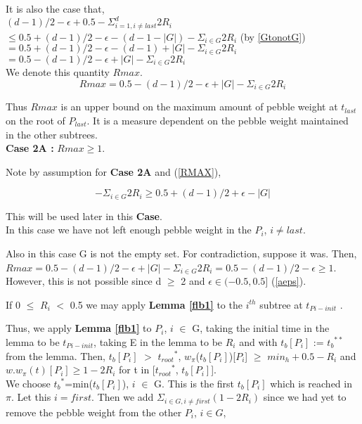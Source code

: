 \documentclass[12pt]{article}
\newcommand{\troots}{{t_{root}}^*}
\newcommand{\tbss}{{t_b}^{**}}
\newcommand{\tbs}{{t_b}^{*}}
\newcommand{\tbith}{t_b[{P_i}]}
\begin{document}
It is also the case that,\\
$(d-1)/2 -\epsilon +0.5- \Sigma_{i=1, i \ne last}^d 2R_i$ $\leq 0.5 + (d-1)/2 - \epsilon - (d-1-|G|) - \Sigma_{ i\in G} 2R_i$ (by \ref{GtonotG})\\
$= 0.5 + (d-1)/2 - \epsilon - (d-1) + |G| - \Sigma_{ i\in G} 2R_i$ \\
$= 0.5 - (d-1)/2 - \epsilon + |G| - \Sigma_{ i\in G} 2R_i$\\
We denote this quantity $Rmax$.
\begin{equation} Rmax = 0.5 - (d-1)/2 - \epsilon + |G| - \Sigma_{ i\in G} 2R_i \label{RMAX}\end{equation}

Thus $Rmax$ is an upper bound on the maximum amount of pebble weight at $t_{last}$ on the root of $P_{last}$. It is a measure dependent on the pebble weight maintained in the other subtrees.\\



\noindent
{\bf Case 2A :} $Rmax \geq 1$.

Note by assumption for {\bf Case 2A} and (\ref{RMAX}),

\begin{equation} -\Sigma_{i \in G} 2R_i \geq 0.5 + (d-1)/2 + \epsilon - |G| \label{rearge}\end{equation}

This will be used later in this {\bf Case}.\\

In this case we have not left enough pebble weight in the $P_i$, $i \ne last$.

Also in this case G is not the empty set. For contradiction, suppose it was. Then, 
$Rmax = 0.5 - (d-1)/2 - \epsilon + |G| - \Sigma_{ i\in G} 2R_i = 0.5 - (d-1)/2 - \epsilon \geq 1$. However, this is not possible since d $\geq$ 2 and $\epsilon \in (-0.5,0.5]$ (\ref{aeps}).

If 0 ${\leq}$ $R_i$ ${<}$ 0.5 we may apply {\bf Lemma \ref{flb1}} to the $i^{th}$ subtree at $t_{Pi-init}$ .

Thus, we apply {\bf Lemma \ref{flb1}} to $P_i$, $i$ $\in$ G, taking the initial time in the lemma to be $t_{Pi-init}$, taking E in the lemma to be ${R_i}$ and with $\tbith$ := $\tbss$ from the lemma. Then, $\tbith$ $>$ $\troots$, $w_{\pi}$($\tbith$)[$P_i$] $\geq$ $min_h + 0.5 - {R_i}$ and $w.w_\pi(t)[P_i] \geq 1 - 2{R_i}$ for t in [$\troots$, $\tbith$]. \\

We choose $\tbs$=min($\tbith$), $i$ $\in$ G. This is the first $\tbith$ which is reached in $\pi$. Let this $i=first$. Then we add $\Sigma_{i \in G, i \ne first} (1 - 2R_i)$ since we had yet to remove the pebble weight from the other $P_i$, $i \in G$,
\end{document}

